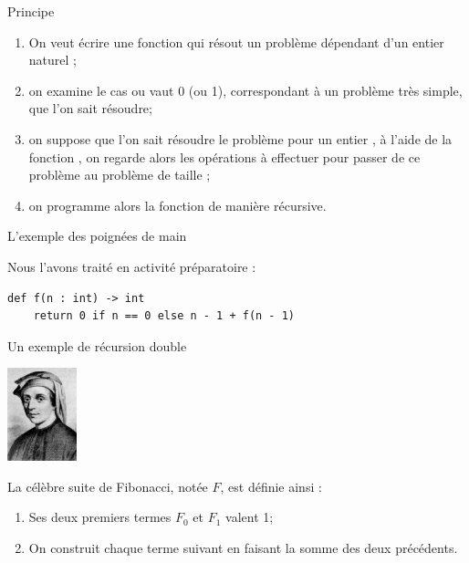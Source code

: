 \documentclass[10pt]{beamer}
\begin{document}
\begin{frame}{Principe}
\begin{enumerate}[--]
	\item 	On veut écrire une fonction  qui résout un problème dépendant d'un entier naturel ;\pause
	\item 	on examine le cas ou  vaut 0 (ou 1), correspondant à un problème très simple, que l'on sait résoudre;\pause
	\item 	on suppose que l'on sait résoudre le problème pour un entier , à l'aide de la fonction , on regarde alors les opérations à effectuer pour passer de ce problème au problème de taille ;\pause
	\item 	on programme alors la fonction  de manière récursive.
\end{enumerate}
\end{frame}





\begin{frame}[fragile]{L'exemple des poignées de main}

Nous l'avons traité en activité préparatoire :

\begin{verbatim}
def f(n : int) -> int
    return 0 if n == 0 else n - 1 + f(n - 1)
\end{verbatim}
\end{frame}



\begin{frame}{Un exemple de récursion double}
\begin{center}
\includegraphics[width=2cm]{img/fibonacci}
\end{center}
La célèbre suite de Fibonacci, notée $F$, est définie ainsi :\pause
\begin{enumerate}[--]
	\item 	Ses deux premiers termes $F_0$ et $F_1$ valent 1;\pause
	\item 	On construit chaque terme suivant en faisant la somme des deux précédents.
\end{enumerate}
\end{frame}
\end{document}
